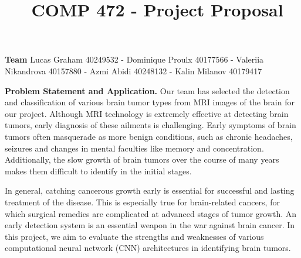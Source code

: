 \documentclass[10pt,twocolumn,letterpaper]{article}
\begin{document}
\title{\ COMP 472 - Project Proposal}  %


\maketitle
\thispagestyle{empty}
\appendix

\textbf{Team}
Lucas Graham 40249532 - Dominique Proulx 40177566 - Valeriia Nikandrova 40157880 - Azmi Abidi 40248132 - Kalin Milanov 40179417




\textbf{Problem Statement and Application.} Our team has selected the detection and classification of various brain tumor types from MRI images of the brain for our project. Although MRI technology is extremely effective at detecting brain tumors, early diagnosis of these ailments is challenging. Early symptoms of brain tumors often masquerade as more benign conditions, such as chronic headaches, seizures and changes in mental faculties like memory and concentration. Additionally, the slow growth of brain tumors over the course of many years makes them difficult to identify in the initial stages. 

In general, catching cancerous growth early is essential for successful and lasting treatment of the disease. This is especially true for brain-related cancers, for which surgical remedies are complicated at advanced stages of tumor growth. An early detection system is an essential weapon in the war against brain cancer. In this project, we aim to evaluate the strengths and weaknesses of various computational neural network (CNN) architectures in identifying brain tumors. 
\end{document}
